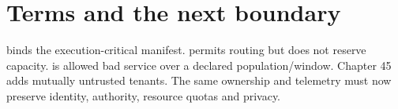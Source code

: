 \section{Terms and the next boundary}
 binds the execution-critical manifest.
 permits routing but does not reserve capacity.
 is allowed bad service over a declared population/window.
Chapter 45 adds mutually untrusted tenants. The same ownership and telemetry
must now preserve identity, authority, resource quotas and privacy.
